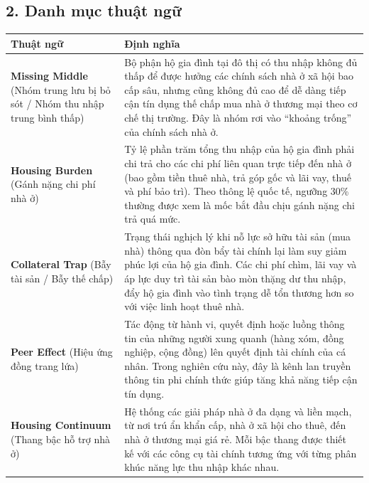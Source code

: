 \documentclass[12pt,a4paper]{report}
\begin{document}
	\vspace{1cm}
	
\subsection*{2. Danh mục thuật ngữ}

\begin{table}[H]
	\centering
	\renewcommand{\arraystretch}{1.3}
	\begin{tabularx}{\textwidth}{>{\raggedright\arraybackslash}p{4cm} X}
		\toprule
		\textbf{Thuật ngữ} & \textbf{Định nghĩa} \\
		\midrule
		
		\textbf{Missing Middle} 
		(Nhóm trung lưu bị bỏ sót / Nhóm thu nhập trung bình thấp) 
		& Bộ phận hộ gia đình tại đô thị có thu nhập không đủ thấp để được hưởng các chính sách nhà ở xã hội bao cấp sâu, nhưng cũng không đủ cao để dễ dàng tiếp cận tín dụng thế chấp mua nhà ở thương mại theo cơ chế thị trường. Đây là nhóm rơi vào “khoảng trống” của chính sách nhà ở. \\
		
		\textbf{Housing Burden} 
		(Gánh nặng chi phí nhà ở) 
		& Tỷ lệ phần trăm tổng thu nhập của hộ gia đình phải chi trả cho các chi phí liên quan trực tiếp đến nhà ở (bao gồm tiền thuê nhà, trả góp gốc và lãi vay, thuế và phí bảo trì). Theo thông lệ quốc tế, ngưỡng 30\% thường được xem là mốc bắt đầu chịu gánh nặng chi trả quá mức. \\
		
		\textbf{Collateral Trap} 
		(Bẫy tài sản / Bẫy thế chấp) 
		& Trạng thái nghịch lý khi nỗ lực sở hữu tài sản (mua nhà) thông qua đòn bẩy tài chính lại làm suy giảm phúc lợi của hộ gia đình. Các chi phí chìm, lãi vay và áp lực duy trì tài sản bào mòn thặng dư thu nhập, đẩy hộ gia đình vào tình trạng dễ tổn thương hơn so với việc linh hoạt thuê nhà. \\
		
		\textbf{Peer Effect} 
		(Hiệu ứng đồng trang lứa) 
		& Tác động từ hành vi, quyết định hoặc luồng thông tin của những người xung quanh (hàng xóm, đồng nghiệp, cộng đồng) lên quyết định tài chính của cá nhân. Trong nghiên cứu này, đây là kênh lan truyền thông tin phi chính thức giúp tăng khả năng tiếp cận tín dụng. \\
		
		\textbf{Housing Continuum} 
		(Thang bậc hỗ trợ nhà ở) 
		& Hệ thống các giải pháp nhà ở đa dạng và liền mạch, từ nơi trú ẩn khẩn cấp, nhà ở xã hội cho thuê, đến nhà ở thương mại giá rẻ. Mỗi bậc thang được thiết kế với các công cụ tài chính tương ứng với từng phân khúc năng lực thu nhập khác nhau. \\
		

\end{tabularx}
\end{table}
\end{document}
